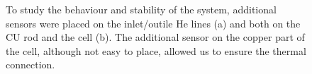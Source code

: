 \begin{refsection}
        \begin{figure}[ht]   
            \centering
            \hfill
            \caption{To study the behaviour and stability of the system, additional \lakeshore sensors were placed on the inlet/outile He lines (a) and both on the CU rod and the cell (b). The additional sensor on the copper part of the cell, although not easy to place, allowed us to ensure the thermal connection.}
            \label{fig:CEX:2023:sensors}
        \end{figure}


\end{refsection}
